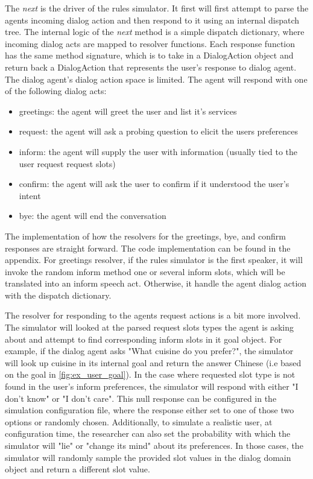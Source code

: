 The \textit{next} is the driver of the rules simulator. It first will first attempt to parse the agents incoming dialog action and then respond to it using an internal dispatch tree. The internal logic of the \textit{next} method is a simple dispatch dictionary, where incoming dialog acts are mapped to resolver functions. Each response function has the same method signature, which is to take in a DialogAction object and return back a DialogAction that represents the user's response to dialog agent. The dialog agent's dialog action space is limited. The agent will respond with one of the following dialog acts:
\begin{itemize}
	\item greetings: the agent will greet the user and list it's services
	\item request: the agent will ask a probing question to elicit the users preferences
	\item inform: the agent will supply the user with information (usually tied to the user request request slots)
	\item confirm: the agent will ask the user to confirm if it understood the user's intent 
	\item bye: the agent will end the conversation  
\end{itemize}

The implementation of how the resolvers for the greetings, bye, and confirm responses are straight forward. The code implementation can be found in the appendix. For greetings resolver, if the rules simulator is the first speaker, it will invoke the random inform method one or several inform slots, which will be translated into an inform speech act. Otherwise, it handle the agent dialog action with the dispatch dictionary. 

The resolver for responding to the agents request actions is a bit more involved. The simulator will looked at the parsed request slots types the agent is asking about and attempt to find corresponding inform slots in it goal object. For example, if the dialog agent asks "What cuisine do you prefer?", the simulator will look up cuisine in its internal goal and return the answer Chinese (i.e based on the goal in \ref{fig:ex_user_goal}). In the case where requested slot type is not found in the user's inform preferences, the simulator will respond with either "I don't know" or "I don't care". This null response can be configured in the simulation configuration file, where the response either set to one of those two options or randomly chosen. Additionally, to simulate a realistic user, at configuration time, the researcher can also set the probability with which the simulator will "lie" or "change its mind" about its preferences. In those cases, the simulator will randomly sample the provided slot values in the dialog domain object and return a different slot value. 

